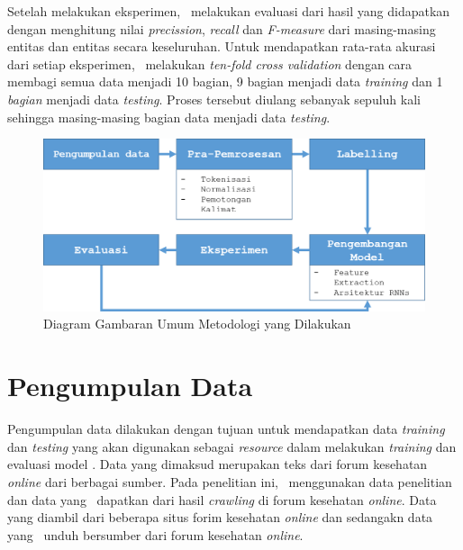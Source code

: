 Setelah melakukan eksperimen, \saya~melakukan evaluasi dari hasil yang didapatkan dengan menghitung nilai \textit{precission}, \textit{recall} dan \textit{F-measure} dari masing-masing entitas dan entitas secara keseluruhan. Untuk mendapatkan rata-rata akurasi dari setiap eksperimen, \saya~melakukan \textit{ten-fold cross validation} dengan cara membagi semua data menjadi 10 bagian, 9 bagian menjadi data \textit{training} dan 1 \textit{bagian} menjadi data \textit{testing}. Proses tersebut diulang sebanyak sepuluh kali sehingga masing-masing bagian data menjadi data \textit{testing}.
\begin{figure}
  \centering
  \includegraphics[width=\linewidth]{images/arsitektur}
  \caption{Diagram Gambaran Umum Metodologi yang Dilakukan}
  \label{fig:metodologi_penelitian}
\end{figure}

\section{Pengumpulan Data}
Pengumpulan data dilakukan dengan tujuan untuk mendapatkan data \textit{training} dan \textit{testing} yang akan digunakan sebagai \textit{resource} dalam melakukan \textit{training} dan evaluasi model \mer. Data yang dimaksud merupakan teks dari forum kesehatan \textit{online} dari berbagai sumber. Pada penelitian ini, \saya~menggunakan data penelitian \cite{skripsiKakRadit} dan data yang \saya~dapatkan dari hasil \textit{crawling} di forum kesehatan \textit{online}. Data yang \cite{skripsiKakRadit} diambil dari beberapa situs forim kesehatan \textit{online} dan sedangakn data yang \saya~unduh bersumber dari forum kesehatan \textit{online}.

